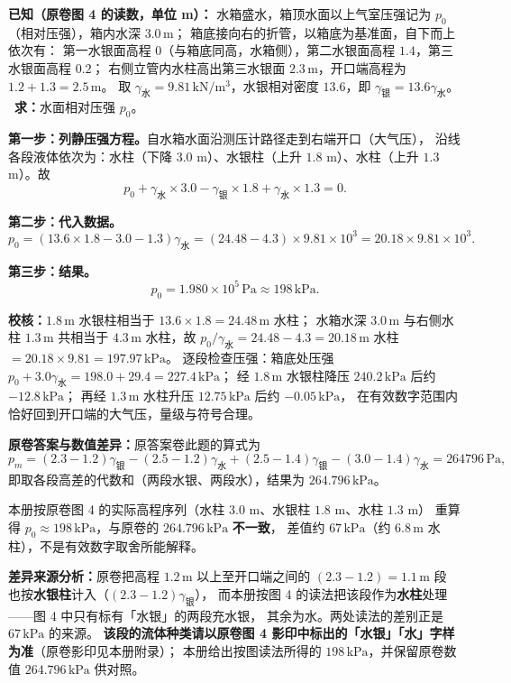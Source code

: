 \begin{jie}
\textbf{已知（原卷图 4 的读数，单位 m）：}
水箱盛水，箱顶水面以上气室压强记为 $p_0$（相对压强），箱内水深 $3.0\,\mathrm{m}$；
箱底接向右的折管，以箱底为基准面，自下而上依次有：
第一水银面高程 $0$（与箱底同高，水箱侧），第二水银面高程 $1.4$，第三水银面高程 $0.2$；
右侧立管内水柱高出第三水银面 $2.3\,\mathrm{m}$，开口端高程为 $1.2+1.3=2.5\,\mathrm{m}$。
取 $\gamma_{\text{水}}=9.81\,\mathrm{kN/m^{3}}$，水银相对密度 $13.6$，即 $\gamma_{\text{银}}=13.6\gamma_{\text{水}}$。
\ \textbf{求：}水面相对压强 $p_0$。

\textbf{第一步：列静压强方程。}自水箱水面沿测压计路径走到右端开口（大气压），
沿线各段液体依次为：水柱（下降 $3.0$ m）、水银柱（上升 $1.8$ m）、水柱（上升 $1.3$ m）。故
\[
p_0+\gamma_{\text{水}}\times3.0-\gamma_{\text{银}}\times1.8+\gamma_{\text{水}}\times1.3=0 .
\]

\textbf{第二步：代入数据。}
\[
p_0=\left(13.6\times1.8-3.0-1.3\right)\gamma_{\text{水}}
=\left(24.48-4.3\right)\times9.81\times10^{3}
=20.18\times9.81\times10^{3}.
\]

\textbf{第三步：结果。}
\[
p_0=1.980\times10^{5}\,\mathrm{Pa}\approx198\,\mathrm{kPa}.
\]

\textbf{校核：}$1.8\,\mathrm{m}$ 水银柱相当于 $13.6\times1.8=24.48\,\mathrm{m}$ 水柱；
水箱水深 $3.0\,\mathrm{m}$ 与右侧水柱 $1.3\,\mathrm{m}$ 共相当于 $4.3\,\mathrm{m}$ 水柱，故
$p_0/\gamma_{\text{水}}=24.48-4.3=20.18\,\mathrm{m}$ 水柱 $=20.18\times9.81=197.97\,\mathrm{kPa}$。
逐段检查压强：箱底处压强 $p_0+3.0\gamma_{\text{水}}=198.0+29.4=227.4\,\mathrm{kPa}$；
经 $1.8\,\mathrm{m}$ 水银柱降压 $240.2\,\mathrm{kPa}$ 后约 $-12.8\,\mathrm{kPa}$；
再经 $1.3\,\mathrm{m}$ 水柱升压 $12.75\,\mathrm{kPa}$ 后约 $-0.05\,\mathrm{kPa}$，
在有效数字范围内恰好回到开口端的大气压，量级与符号合理。
\end{jie}

\begin{tishi}
\textbf{原卷答案与数值差异：}原答案卷此题的算式为
\[
p_m=(2.3-1.2)\gamma_{\text{银}}-(2.5-1.2)\gamma_{\text{水}}+(2.5-1.4)\gamma_{\text{银}}-(3.0-1.4)\gamma_{\text{水}}
=264796\,\mathrm{Pa},
\]
即取各段高差的代数和（两段水银、两段水），结果为 $264.796\,\mathrm{kPa}$。

本册按原卷图 4 的实际高程序列（水柱 $3.0$ m、水银柱 $1.8$ m、水柱 $1.3$ m）
重算得 $p_0\approx198\,\mathrm{kPa}$，与原卷的 $264.796\,\mathrm{kPa}$ \textbf{不一致}，
差值约 $67\,\mathrm{kPa}$（约 $6.8\,\mathrm{m}$ 水柱），不是有效数字取舍所能解释。

\textbf{差异来源分析：}原卷把高程 $1.2\,\mathrm{m}$ 以上至开口端之间的 $(2.3-1.2)=1.1\,\mathrm{m}$ 段
也按\textbf{水银柱}计入（$(2.3-1.2)\gamma_{\text{银}}$），
而本册按图 4 的读法把该段作为\textbf{水柱}处理——图 4 中只有标有「水银」的两段充水银，
其余为水。两处读法的差别正是 $67\,\mathrm{kPa}$ 的来源。
\textbf{该段的流体种类请以原卷图 4 影印中标出的「水银」「水」字样为准}（原卷影印见本册附录）；
本册给出按图读法所得的 $198\,\mathrm{kPa}$，并保留原卷数值 $264.796\,\mathrm{kPa}$ 供对照。
\end{tishi}


